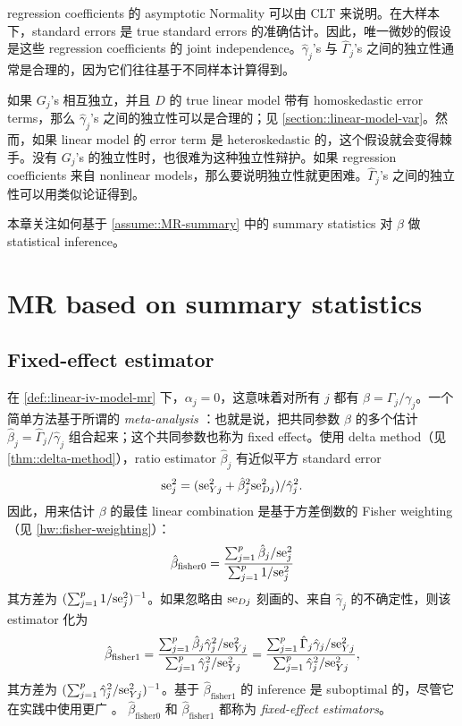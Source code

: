 regression coefficients 的 asymptotic Normality 可以由 CLT 来说明。在大样本下，standard errors 是 true standard errors 的准确估计。因此，唯一微妙的假设是这些 regression coefficients 的 joint independence。$\hat{\gamma}_j$'s 与 $\hat{\Gamma}_j$'s 之间的独立性通常是合理的，因为它们往往基于不同样本计算得到。

如果 $G_j$'s 相互独立，并且 $D$ 的 true linear model 带有 homoskedastic error terms，那么 $\hat{\gamma}_j$'s 之间的独立性可以是合理的；见 \cref{section::linear-model-var}。然而，如果 linear model 的 error term 是 heteroskedastic 的，这个假设就会变得棘手。没有 $G_j$'s 的独立性时，也很难为这种独立性辩护。如果 regression coefficients 来自 nonlinear models，那么要说明独立性就更困难。$\hat{\Gamma}_j$'s 之间的独立性可以用类似论证得到。

本章关注如何基于 \cref{assume::MR-summary} 中的 summary statistics 对 $\beta$ 做 statistical inference。



\section{MR based on summary statistics}


\subsection{Fixed-effect estimator}\label{sec::mr-fixed-effect}


在 \cref{def::linear-iv-model-mr} 下，$\alpha_j = 0$，这意味着对所有 $j$ 都有 $\beta = \Gamma_j / \gamma_j$。一个简单方法基于所谓的 {\it meta-analysis} \citep{bowden2018improving}：也就是说，把共同参数 $\beta$ 的多个估计 $\hat{\beta}_j =  \hat \Gamma_j / \hat\gamma_j$ 组合起来；这个共同参数也称为 fixed effect。使用 delta method（见 \cref{thm::delta-method}），ratio estimator $\hat{\beta}_j$ 有近似平方 standard error
$$
\textup{se}_j^2 = (\textup{se}_{Yj}^2 + \hat{\beta}_j^2\textup{se}_{Dj}^2  )    / \hat\gamma_j^2.
$$
因此，用来估计 $\beta$ 的最佳 linear combination 是基于方差倒数的 Fisher weighting（见 \cref{hw::fisher-weighting}）：
$$
\hat{\beta}_{\text{fisher}0} =  \frac{ \sum_{j=1}^p  \hat{\beta}_j  / \textup{se}_j^2  }{ \sum_{j=1}^p 1  / \textup{se}_j^2 }
$$
其方差为 $(\sum_{j=1}^p 1  / \textup{se}_j^2)^{-1} $。如果忽略由 $\textup{se}_{Dj}$ 刻画的、来自 $\hat\gamma_j$ 的不确定性，则该 estimator 化为
$$
\hat{\beta}_{\text{fisher}1} =  \frac{ \sum_{j=1}^p  \hat{\beta}_j  \hat\gamma_j^2 /  \textup{se}_{Yj}^2 }{ \sum_{j=1}^p   \hat\gamma_j^2 /  \textup{se}_{Yj}^2 }
=\frac{ \sum_{j=1}^p  \hat \Gamma_j   \hat\gamma_j /  \textup{se}_{Yj}^2 }{ \sum_{j=1}^p   \hat\gamma_j^2 /  \textup{se}_{Yj}^2 },
$$
其方差为 $( \sum_{j=1}^p   \hat\gamma_j^2 /  \textup{se}_{Yj}^2 )^{-1}$。基于 $\hat{\beta}_{\text{fisher}1} $ 的 inference 是 suboptimal 的，尽管它在实践中使用更广 \citep{bowden2018improving}。
$\hat{\beta}_{\text{fisher}0}$ 和 $\hat{\beta}_{\text{fisher}1}$ 都称为 {\it fixed-effect estimators}。


